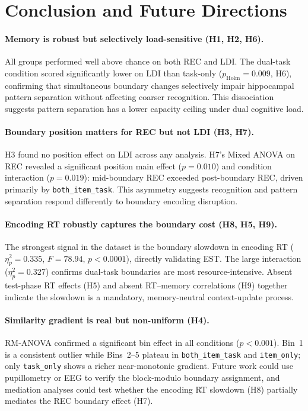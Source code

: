 \documentclass[10pt,a4paper]{article}
\begin{document}
\section{Conclusion and Future Directions}

\paragraph{Memory is robust but selectively load-sensitive (H1, H2, H6).}
All groups performed well above chance on both REC and LDI. The dual-task condition scored significantly lower on LDI than task-only ($p_{\mathrm{Holm}}{=}0.009$, H6), confirming that simultaneous boundary changes selectively impair hippocampal pattern separation without affecting coarser recognition. This dissociation suggests pattern separation has a lower capacity ceiling under dual cognitive load.

\paragraph{Boundary position matters for REC but not LDI (H3, H7).}
H3 found no position effect on LDI across any analysis. H7's Mixed ANOVA on REC revealed a significant position main effect ($p{=}0.010$) and condition interaction ($p{=}0.019$): mid-boundary REC exceeded post-boundary REC, driven primarily by \texttt{both\_item\_task}. This asymmetry suggests recognition and pattern separation respond differently to boundary encoding disruption.

\paragraph{Encoding RT robustly captures the boundary cost (H8, H5, H9).}
The strongest signal in the dataset is the boundary slowdown in encoding RT ($\eta^2_p{=}0.335$, $F{=}78.94$, $p{<}0.0001$), directly validating EST. The large interaction ($\eta^2_p{=}0.327$) confirms dual-task boundaries are most resource-intensive. Absent test-phase RT effects (H5) and absent RT--memory correlations (H9) together indicate the slowdown is a mandatory, memory-neutral context-update process.

\paragraph{Similarity gradient is real but non-uniform (H4).}
RM-ANOVA confirmed a significant bin effect in all conditions ($p{<}0.001$). Bin~1 is a consistent outlier while Bins~2--5 plateau in \texttt{both\_item\_task} and \texttt{item\_only}; only \texttt{task\_only} shows a richer near-monotonic gradient. Future work could use pupillometry or EEG to verify the block-modulo boundary assignment, and mediation analyses could test whether the encoding RT slowdown (H8) partially mediates the REC boundary effect (H7).
\end{document}

